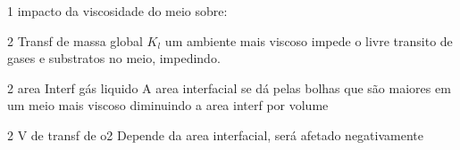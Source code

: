 \documentclass[\mainfilename]{subfiles}
\begin{document}
\setcounter{question}{3}
\begin{questionBox}1{ %
    impacto da viscosidade do meio sobre:
} %
    \begin{questionBox}2{ %
        Transf de massa global \(K_l\)
    } %
        \answer{}
        um ambiente mais viscoso impede o livre transito de gases e substratos no meio, impedindo.
    \end{questionBox}
    \begin{questionBox}2{ %
        area Interf gás liquido
    } %
        \answer{}
        A area interfacial se dá pelas bolhas que são maiores em um meio mais viscoso diminuindo a area interf por volume
    \end{questionBox}
    \begin{questionBox}2{ %
        V de transf de o2
    } %
        Depende da area interfacial, será afetado negativamente
    \end{questionBox}
\end{questionBox}
\end{document}

